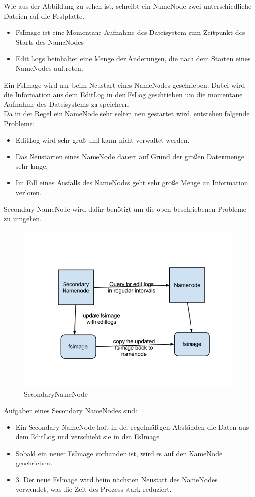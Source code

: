 Wie aus der Abbildung zu sehen ist, schreibt ein NameNode zwei unterschiedliche Dateien auf die Festplatte. \\
\begin{itemize}
\item FsImage ist eine Momentane Aufnahme des Dateisystem zum Zeitpunkt des Starts des NameNodes
\item Edit Logs beinhaltet eine Menge der Änderungen, die nach dem Starten eines NameNodes auftreten.
\end{itemize}
Ein FsImage wird nur beim Neustart eines NameNodes geschrieben. Dabei wird die Information aus dem EditLog in den FsLog geschrieben um die momentane Aufnahme des Dateisystems zu speichern.\\
Da in der Regel ein NameNode sehr selten neu gestartet wird, entstehen folgende Probleme:
\begin{itemize}
\item EditLog wird sehr groß und kann nicht verwaltet werden.
\item Das Neustarten eines NameNode dauert auf Grund der großen Datenmenge sehr lange.
\item Im Fall eines Ausfalls des NameNodes geht sehr große Menge an Information verloren.
\end{itemize}
Secondary NameNode wird dafür benötigt um die oben beschriebenen Probleme zu umgehen.\\
\begin{figure}
	\centering
	\includegraphics[width=1.0\textwidth]{images/secondarynamenode.png}
	\caption{SecondaryNameNode}
	\label{img:grafik-SecondaryNameNode}
\end{figure}
Aufgaben eines Secondary NameNodes sind:
\begin{itemize}
\item Ein Secondary NameNode holt in der regelmäßigen Abständen die Daten aus dem EditLog und verschiebt sie in den FsImage.
\item Sobald ein neuer FsImage vorhanden ist, wird es auf den NameNode geschrieben.
\item 3. Der neue FsImage wird beim nächsten Neustart des NameNodes verwendet, was die Zeit des Prozess stark reduziert.
\end{itemize}
\cite{secNameNode}

